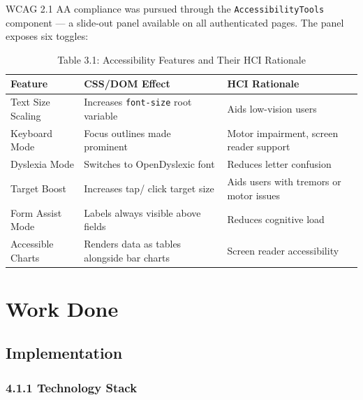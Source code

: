 \documentclass[12pt,a4paper]{report}
\begin{document}
WCAG 2.1 AA compliance was pursued through the \texttt{AccessibilityTools} component — a slide-out panel available on all authenticated pages. The panel exposes six toggles:

\begin{table}[H]
\centering
\caption{Table 3.1: Accessibility Features and Their HCI Rationale}
\begin{tabular}{p{3.5cm}p{4cm}p{5cm}}
\toprule
\textbf{Feature} & \textbf{CSS/DOM Effect} & \textbf{HCI Rationale} \\
\midrule
Text Size Scaling & Increases \texttt{font-size} root variable & Aids low-vision users \\
Keyboard Mode & Focus outlines made prominent & Motor impairment, screen reader support \\
Dyslexia Mode & Switches to OpenDyslexic font & Reduces letter confusion \\
Target Boost & Increases tap/ click target size & Aids users with tremors or motor issues \\
Form Assist Mode & Labels always visible above fields & Reduces cognitive load \\
Accessible Charts & Renders data as tables alongside bar charts & Screen reader accessibility \\
\bottomrule
\end{tabular}
\end{table}

\chapter{Work Done}

\section{Implementation}

\subsection{4.1.1 Technology Stack}
\end{document}
